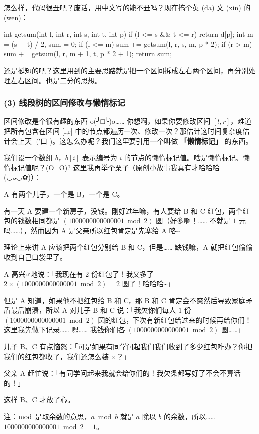 怎么样，代码很丑吧？废话，用中文写的能不丑吗？现在搞个英 (da) 文 (xin) 的 (wen)：

\begin{cppcode}
int getsum(int l, int r, int s, int t, int p) {
  if (l <= s && t <= r) return d[p];
  int m = (s + t) / 2, sum = 0;
  if (l <= m) sum += getsum(l, r, s, m, p * 2);
  if (r > m) sum += getsum(l, r, m + 1, t, p * 2 + 1);
  return sum;
}
\end{cppcode}

还是挺短的吧？这里用到的主要思路就是把一个区间拆成左右两个区间，再分别处理左右区间。也是二分的思想。

\subsubsection{(3) 线段树的区间修改与懒惰标记}

区间修改是个很有趣的东西 o(╯□╰)o…… 你想啊，如果你要修改区间 $[l,r]$，难道把所有包含在区间 [l,r] 中的节点都遍历一次、修改一次？那估计这时间复杂度估计会上天 |(′口 )。这怎么办呢？我们这里要引用一个叫做 \textbf{「懒惰标记」} 的东西。

我们设一个数组 $b$，$b[i]$ 表示编号为 $i$ 的节点的懒惰标记值。啥是懒惰标记、懒惰标记值呢？(O\_O)? 这里我再举个栗子（原创小故事我真有才哈哈哈 (◡ᴗ◡✿)）：

\begin{QUOTE}{}{}
A 有两个儿子，一个是 B，一个是 C。



有一天 A 要建一个新房子，没钱。刚好过年嘛，有人要给 B 和 C 红包，两个红包的钱数相同都是 $(1000000000000001\bmod 2)$ 圆（好多啊！…… 不就是 $1$ 元吗……），然而因为 A 是父亲所以红包肯定是先塞给 A 咯\textasciitilde{}



理论上来讲 A 应该把两个红包分别给 B 和 C，但是…… 缺钱嘛，A 就把红包偷偷收到自己口袋里了。



A 高兴♂地说：「我现在有 $2$ 份红包了！我又多了 $2\times (1000000000000001\bmod 2)=2$ 圆了！哈哈哈\textasciitilde{}」



但是 A 知道，如果他不把红包给 B 和 C，那 B 和 C 肯定会不爽然后导致家庭矛盾最后崩溃，所以 A 对儿子 B 和 C 说：「我欠你们每人 $1$ 份 $(1000000000000001\bmod 2)$ 圆的红包，下次有新红包给过来的时候再给你们！这里我先做下记录…… 嗯…… 我钱你们各 $(1000000000000001\bmod 2)$ 圆……」



儿子 B、C 有点恼怒：「可是如果有同学问起我们我们收到了多少红包咋办？你把我们的红包都收了，我们还怎么装 ×？」



父亲 A 赶忙说：「有同学问起来我就会给你们的！我欠条都写好了不会不算话的！」



这样 B、C 才放了心。



注：$\bmod$ 是取余数的意思，$a\bmod b$ 就是 $a$ 除以 $b$ 的余数，所以……$1000000000000001\bmod 2=1$。
\end{QUOTE}

